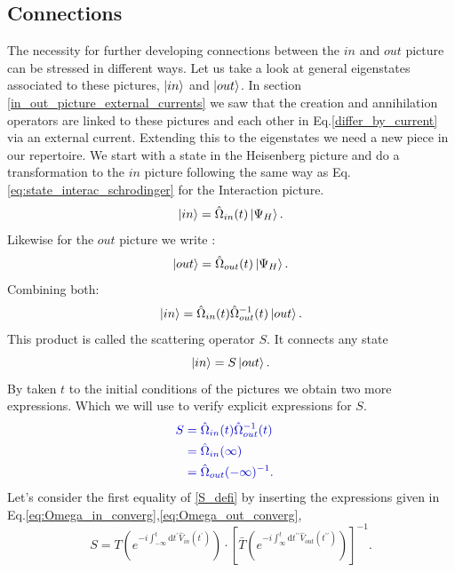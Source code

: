 \documentclass[12pt, titlepage]{article}
\begin{document}
\subsection{Connections}\label{Connections}
The necessity for further developing connections between the $ in $ and $ out $ picture can be stressed in different ways. 
Let us take a look at general eigenstates associated to these pictures, $ \ket{in} $ and $ \ket{out} $. In section \ref{in_out_picture_external_currents} we saw that the creation and annihilation operators are linked to these pictures and each other in Eq.\enskip\eqref{differ_by_current} via an external current. 
Extending this to the eigenstates we need a new piece in our repertoire. 
We start with a state in the Heisenberg picture and do a transformation to the $ in $ picture following the same way as Eq.\enskip\eqref{eq:state_interac_schrodinger} for the Interaction picture.
\begin{equation}
\ket{in}=\hat{\Omega}_{in}(t)\ket{\Psi_{H}}.
\end{equation}
Likewise for the $ out $ picture we write :
\begin{equation}
\ket{out}=\hat{\Omega}_{out}(t)\ket{\Psi_{H}}.
\end{equation}
Combining both:
\begin{equation}
\ket{in}=\hat{\Omega}_{in}(t)\hat{\Omega}^{-1}_{out}(t)\ket{out}.
\end{equation}
This product is called the scattering operator $ S $. It connects any state 
\begin{equation}
\ket{in}=S\ket{out}.
\end{equation}
By taken $ t $ to the initial conditions of the pictures we obtain two more expressions. Which we will use to verify explicit expressions for $ S $. 
\begin{subequations}\label{S_defi}
\textcolor[RGB]{0,0,204}{
\begin{align}
	S&=
	\hat{\Omega}_{in}(t)\hat{\Omega}^{-1}_{out}(t)
	&\\
	&=\hat{\Omega}_{in}(\infty)
	&\\
	&=\hat{\Omega}_{out}(-\infty)^{-1}
	.
\end{align}
}
\end{subequations}
Let's consider the first equality of \eqref{S_defi} by inserting the expressions given in Eq.\enskip\eqref{eq:Omega_in_converg},\eqref{eq:Omega_out_converg},
\begin{equation}
S=T\left( e^{-i\int_{-\infty}^{t}\mathrm{d}t^{\prime} \hat{V}_{in}(t^{\prime})} \right)
	\cdot
	\left[ 
	\bar{T}\left( e^{-i\int_{\infty}^{t}\mathrm{d}t^{\prime \prime} \hat{V}_{out}(t^{\prime \prime})} \right)
\right]^{-1}	
	.
\end{equation}
\end{document}
